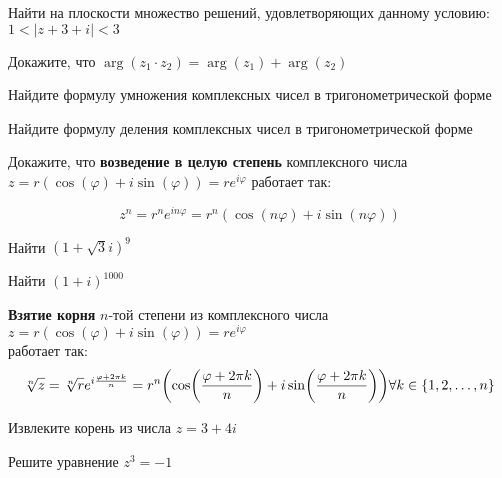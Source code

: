 \documentclass{article}
\begin{document}
\begin{task_boxed}
	Найти на плоскости множество решений, удовлетворяющих данному условию: $1 < |z + 3 + i| < 3$
\end{task_boxed}

\begin{task_boxed}
	Докажите, что $\arg(z_1 \cdot z_2) = \arg(z_1) + \arg(z_2)$
\end{task_boxed}

\begin{task_boxed}
	Найдите формулу умножения комплексных чисел в тригонометрической форме
\end{task_boxed}

\begin{task_boxed}
	Найдите формулу деления комплексных чисел в тригонометрической форме
\end{task_boxed}

\begin{task_boxed}
	Докажите, что \textbf{возведение в целую степень} комплексного числа $z = r(\cos(\varphi) + i \sin(\varphi)) = re^{i\varphi}$ работает так:

	\[z^n = r^n e^{in\varphi} = r^n(\cos(n\varphi) + i \sin(n\varphi))\]
\end{task_boxed}

\begin{task_boxed}
Найти $(1 + \sqrt{3}i)^{9}$
\end{task_boxed}

\begin{task_boxed}
Найти $(1 + i)^{1000}$
\end{task_boxed}

\begin{definition_boxed}
	\textbf{Взятие корня} $n$-той степени из комплексного числа $z = r(\cos(\varphi) + i \sin(\varphi)) = re^{i\varphi}$\\
	работает так:
	\[\sqrt[n]{z} = \sqrt[n]{r} e^{i\frac{\varphi + 2\pi k}{n}} = r^n\lr*{\cos\lr*{\frac{\varphi + 2\pi k}{n}} + i \sin\lr*{\frac{\varphi + 2\pi k}{n}}} \forall k \in \{1,2,\dotsc, n\}\]
\end{definition_boxed}

\begin{task_boxed}
	Извлеките корень из числа $z=3+4i$
\end{task_boxed}

\begin{task_boxed}
	Решите уравнение $z^3=-1$
\end{task_boxed}
\end{document}
